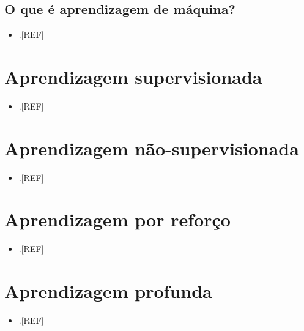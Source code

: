 \documentclass[
  a4paper,
]{book}
\providecommand{\tightlist}{%
  \setlength{\itemsep}{0pt}\setlength{\parskip}{0pt}}
\begin{document}
\hypertarget{o-que-uxe9-aprendizagem-de-muxe1quina}{%
\subsection{O que é aprendizagem de máquina?}\label{o-que-uxe9-aprendizagem-de-muxe1quina}}

\begin{itemize}
\tightlist
\item
  .{[}REF{]}
\end{itemize}

\hypertarget{aprendizagem-supervisionada}{%
\section{Aprendizagem supervisionada}\label{aprendizagem-supervisionada}}

\begin{itemize}
\tightlist
\item
  .{[}REF{]}
\end{itemize}

\hypertarget{aprendizagem-nuxe3o-supervisionada}{%
\section{Aprendizagem não-supervisionada}\label{aprendizagem-nuxe3o-supervisionada}}

\begin{itemize}
\tightlist
\item
  .{[}REF{]}
\end{itemize}

\hypertarget{aprendizagem-por-reforuxe7o}{%
\section{Aprendizagem por reforço}\label{aprendizagem-por-reforuxe7o}}

\begin{itemize}
\tightlist
\item
  .{[}REF{]}
\end{itemize}

\hypertarget{aprendizagem-profunda}{%
\section{Aprendizagem profunda}\label{aprendizagem-profunda}}

\begin{itemize}
\tightlist
\item
  .{[}REF{]}
\end{itemize}
\end{document}
